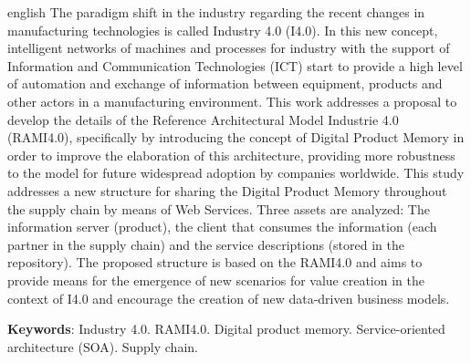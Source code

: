 \begin{resumo}[Abstract]
	\begin{otherlanguage*}{english}
		The paradigm shift in the industry regarding the recent changes in manufacturing technologies is called Industry 4.0 (I4.0). In this new concept, intelligent networks of machines and processes for industry with the support of Information and Communication Technologies (ICT) start to provide a high level of automation and exchange of information between equipment, products and other actors in a manufacturing environment.
		This work addresses a proposal to develop the details of the Reference Architectural Model Industrie 4.0 (RAMI4.0), specifically by introducing the concept of Digital Product Memory in order to improve the elaboration of this architecture, providing more robustness to the model for future widespread adoption by companies worldwide.
		This study addresses a new structure for sharing the Digital Product Memory throughout the supply chain by means of Web Services. Three assets are analyzed: The information server (product), the client that consumes the information (each partner in the supply chain) and the service descriptions (stored in the repository).
		The proposed structure is based on the RAMI4.0 and aims to provide means for the emergence of new scenarios for value creation in the context of I4.0 and encourage the creation of new data-driven business models.

		\vspace{\onelineskip}

		\noindent
		\textbf{Keywords}: Industry 4.0. RAMI4.0. Digital product memory. Service-oriented architecture (SOA). Supply chain.
	\end{otherlanguage*}
\end{resumo}

\listoffigures*
\cleardoublepage

\listoftables*
\cleardoublepage


